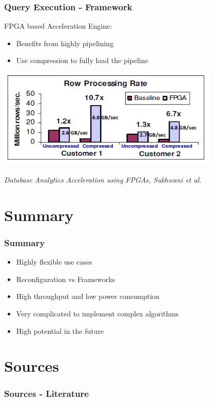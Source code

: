 \documentclass{beamer}
\begin{document}
\begin{frame}
	\frametitle{Query Execution - Framework}
	FPGA based Acceleration Engine:
	\begin{itemize}
		\item Benefits from highly pipelining
		\item Use compression to fully load the pipeline
	\end{itemize}
	
	\begin{center}
		\includegraphics[width=0.8\textwidth]{img/engine_eval.png}
	\end{center}

	\begin{center}
		\small \emph{Database Analytics Acceleration using FPGAs, Sukhwani et al.}
	\end{center}
\end{frame}

\section{Summary}
\begin{frame}
	\frametitle{Summary}
	\begin{itemize}
		\item Highly flexible use cases
		\item Reconfiguration vs Frameworks
		\item High throughput and low power consumption
		\item Very complicated to implement complex algorithms
		\item High potential in the future
	\end{itemize}
\end{frame}

\section{Sources}
\begin{frame}
	\frametitle{Sources - Literature}
\end{frame}
\end{document}
